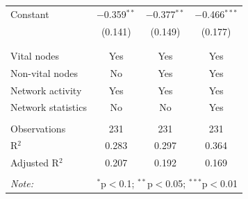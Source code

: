 \begin{table}[!htbp]
\begin{tabular}{@{\extracolsep{5pt}}lccc}
 Constant & $-$0.359$^{**}$ & $-$0.377$^{**}$ & $-$0.466$^{***}$ \\ 
  & (0.141) & (0.149) & (0.177) \\ 
  & & & \\ 
\hline \\[-1.8ex] 
Vital nodes & Yes & Yes & Yes \\ 
Non-vital nodes & No & Yes & Yes \\ 
Network activity & Yes & Yes & Yes \\ 
Network statistics & No & No & Yes \\ 
\hline &  &  &  \\ 
Observations & 231 & 231 & 231 \\ 
R$^{2}$ & 0.283 & 0.297 & 0.364 \\ 
Adjusted R$^{2}$ & 0.207 & 0.192 & 0.169 \\ 
\hline 
\hline \\[-1.8ex] 
\textit{Note:}  & \multicolumn{3}{r}{$^{*}$p$<$0.1; $^{**}$p$<$0.05; $^{***}$p$<$0.01} \\ 
\end{tabular} 
\end{table} 
